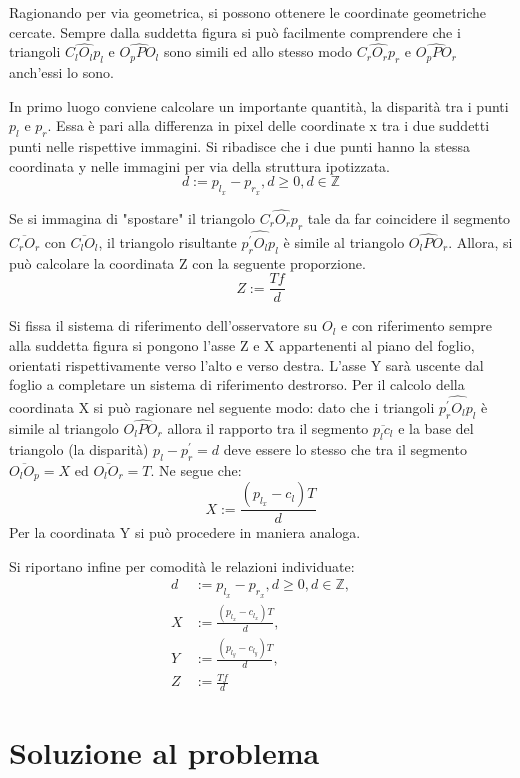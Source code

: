Ragionando per via geometrica, si possono ottenere le coordinate geometriche cercate. Sempre dalla suddetta figura si può facilmente comprendere che i triangoli  $\widehat{C_lO_lp_l}$ e $\widehat{O_pPO_l}$ sono simili ed allo stesso modo $\widehat{C_rO_rp_r}$ e $\widehat{O_pPO_r}$ anch'essi lo sono. 

In primo luogo conviene calcolare un importante quantità, la disparità tra i punti $p_l$ e $p_r$. Essa è pari alla differenza in pixel delle coordinate x  tra i due suddetti punti nelle rispettive immagini. Si ribadisce che i due punti hanno la stessa coordinata y nelle immagini per via della struttura ipotizzata.
\begin{equation}
	d := p_{l_x} - p_{r_x}, d \ge 0, d \in \mathbb{Z}
\end{equation}

Se si immagina di "spostare" il triangolo $\widehat{C_rO_rp_r}$ tale da far coincidere il segmento $\overline{C_rO_r}$ con $\overline{C_lO_l}$, il triangolo risultante $\widehat{p_r^{'}O_lp_l}$ è simile al triangolo $\widehat{O_lPO_r}$. Allora, si può calcolare la coordinata Z con la seguente proporzione.
\begin{equation}
Z := \frac{Tf}{d}
\end{equation}

Si fissa il sistema di riferimento dell'osservatore su $O_l$ e con riferimento sempre alla suddetta figura si pongono l'asse Z e X appartenenti al piano del foglio, orientati rispettivamente verso l'alto e verso destra. L'asse Y sarà uscente dal foglio a completare un sistema di riferimento destrorso. 
Per il calcolo della coordinata X si può ragionare nel seguente modo: dato che i triangoli $\widehat{p_r^{'}O_lp_l}$ è simile al triangolo $\widehat{O_lPO_r}$ allora il rapporto tra il segmento $\overline{p_lc_l}$ e la base del triangolo (la disparità) $p_l - p_r^{'} = d$ deve essere lo stesso che tra il segmento $\overline{O_lO_p} = X$ ed $\overline{O_lO_r} = T$. Ne segue che:
\begin{equation}
	X := \frac{(p_{l_x} - c_l) T}{d}
\end{equation}
Per la coordinata Y si può procedere in maniera analoga.

Si riportano infine per comodità le relazioni individuate:
\begin{align}
	d &:= p_{l_x} - p_{r_x}, d \ge 0, d \in \mathbb{Z},\\
	X &:= \frac{(p_{l_x} - c_{l_x}) T}{d},\\
	Y &:= \frac{(p_{l_y} - c_{l_y}) T}{d},\\
	Z &:= \frac{Tf}{d}
\end{align}


\section{Soluzione al problema}
\label{sec:vision:solution}


